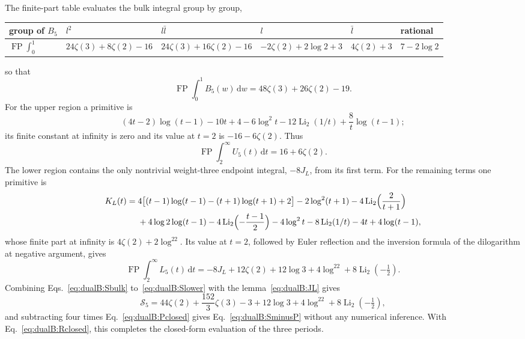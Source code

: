 \documentclass[11pt,a4paper]{article}
\numberwithin{equation}{section}
\newcommand{\dd}{\,\mathrm d}
\newcommand{\FP}{\operatorname{FP}}
\newcommand{\Li}{\operatorname{Li}}
\begin{document}
The finite-part table evaluates the bulk integral group by group,
\begin{center}\small
\begin{tabular}{@{}llllll@{}}
\toprule
group of $B_5$ & $l^2$ & $l\bar l$ & $l$ & $\bar l$ & rational\\
\midrule
$\FP\int_0^1$ & $24\zeta(3)+8\zeta(2)-16$ & $24\zeta(3)+16\zeta(2)-16$ & $-2\zeta(2)+2\log2+3$ & $4\zeta(2)+3$
 & $7-2\log2$\\
\bottomrule
\end{tabular}
\end{center}
so that
\begin{equation}
 \FP\!\int_0^1B_5(w)\dd w=48\zeta(3)+26\zeta(2)-19.
 \label{eq:dualB:Sbulk}
\end{equation}
For the upper region a primitive is
\begin{equation}
 (4t-2)\log(t-1)-10t+4-6\log^2t-12\Li_2(1/t)+\frac8t\log(t-1);
\end{equation}
its finite constant at infinity is zero and its value at $t=2$ is $-16-6\zeta(2)$. Thus
\begin{equation}
 \FP\!\int_2^\infty U_5(t)\dd t=16+6\zeta(2).
 \label{eq:dualB:Supper}
\end{equation}
The lower region contains the only nontrivial weight-three endpoint integral, $-8J_L$, from its first term. For the
remaining terms one primitive is
\begin{equation}
\begin{aligned}
 K_L(t)={}&4\bigl[(t-1)\log(t-1)-(t+1)\log(t+1)+2\bigr]-2\log^2(t+1)-4\Li_2\Bigl(\frac2{t+1}\Bigr)\\
 &+4\log2\log(t-1)-4\Li_2\Bigl(-\frac{t-1}{2}\Bigr)-4\log^2t-8\Li_2(1/t)-4t+4\log(t-1),
\end{aligned}
\end{equation}
whose finite part at infinity is $4\zeta(2)+2\log^22$. Its value at $t=2$, followed by Euler reflection and the
inversion formula of the dilogarithm at negative argument, gives
\begin{equation}
 \FP\!\int_2^\infty L_5(t)\dd t=-8J_L+12\zeta(2)+12\log3+4\log^22+8\Li_2(-\tfrac12).
 \label{eq:dualB:Slower}
\end{equation}
Combining Eqs.~\eqref{eq:dualB:Sbulk} to~\eqref{eq:dualB:Slower} with the lemma~\eqref{eq:dualB:JL} gives
\begin{equation}
 \mathcal S_5=44\zeta(2)+\frac{152}{3}\zeta(3)-3+12\log3+4\log^22+8\Li_2(-\tfrac12),
 \label{eq:dualB:Sclosed}
\end{equation}
and subtracting four times Eq.~\eqref{eq:dualB:Pclosed} gives Eq.~\eqref{eq:dualB:SminusP} without any numerical
inference. With Eq.~\eqref{eq:dualB:Rclosed}, this completes the closed-form evaluation of the three periods.
\end{document}
